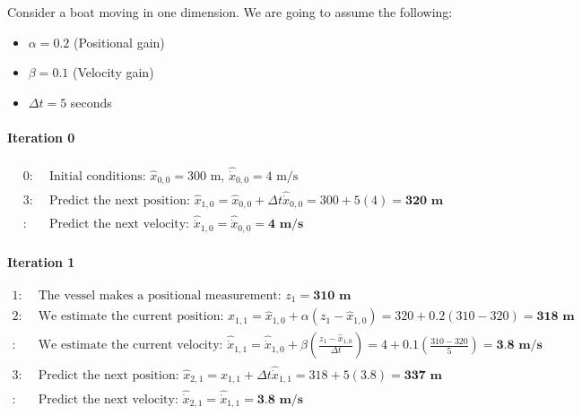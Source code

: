 

        \begin{example} \label{ex:alpha_beta_filter}
        Consider a boat moving in one dimension. 
        We are going to assume the following:
        \begin{itemize}
            \item $\alpha = 0.2$ (Positional gain)
            \item $\beta = 0.1$ (Velocity gain)
            \item $\Delta t = 5$ seconds
        \end{itemize}

        \paragraph{Iteration 0}
        \begin{equation*}
            \begin{aligned} 
                0:& \text{ Initial conditions: } \hat{x}_{0,0} = 300 \text{ m, } \hat{\dot{x}}_{0,0} = 4 \text{ m/s} \\
                3:& \text{ Predict the next position: } \hat{x}_{1,0} = \hat{x}_{0,0} + \Delta t \hat{\dot{x}}_{0,0} = 300 + 5(4) = \textbf{320 m} \\
                 :& \text{ Predict the next velocity: } \hat{\dot{x}}_{1,0} = \hat{\dot{x}}_{0,0} = \textbf{4 m/s}
            \end{aligned}
        \end{equation*}
        
        \paragraph{Iteration 1}
        \begin{equation*}
            \begin{aligned} 
                1:& \text{ The vessel makes a positional measurement: } z_1 = \textbf{310 m} \\
                2:& \text{ We estimate the current position: } \hat{x}_{1,1} = \hat{x}_{1,0} + \alpha(z_1 - \hat{x}_{1,0}) = 320 + 0.2(310 - 320) = \textbf{318 m} \\
                 :& \text{ We estimate the current velocity: } \hat{\dot{x}}_{1,1} = \hat{\dot{x}}_{1,0} + \beta(\frac{z_1 - \hat{x}_{1,0}}{\Delta t}) = 4 + 0.1(\frac{310 - 320}{5}) = \textbf{3.8 m/s} \\
                3:& \text{ Predict the next position: } \hat{x}_{2,1} = \hat{x}_{1,1} + \Delta t \hat{\dot{x}}_{1,1} = 318 + 5(3.8) = \textbf{337 m} \\
                 :& \text{ Predict the next velocity: } \hat{\dot{x}}_{2,1} = \hat{\dot{x}}_{1,1} = \textbf{3.8 m/s}
            \end{aligned}
        \end{equation*}


\end{example}
